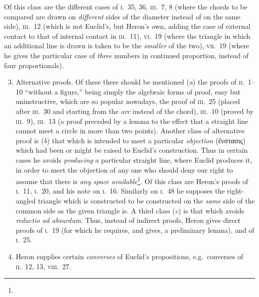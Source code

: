 Of this class are the different cases of \textsc{i}.~35, 36, \textsc{iii}.~7, 8 (where the chords to be compared are drawn on \emph{different} sides of the diameter instead of on the same side), \textsc{iii}.~12 (which is not Euclid's, but Heron's own, adding the case of external contact to that of internal contact in \textsc{iii}.~11), \textsc{vi}.~19 (where the triangle in which an additional line is drawn is taken to be the \emph{smaller} of the two), \textsc{vii}.~19 (where he gives the particular case of \emph{three} numbers in continued proportion, instead of four proportionals).

\begin{enumerate}[label=(\arabic*)]
	\setcounter{enumi}{2}
	\item Alternative proofs. Of these there should be mentioned (\emph{a}) the proofs of \textsc{ii}.~1--10 ``without a figure,'' being simply the algebraic forms of proof, easy but uninstructive, which are so popular nowadays, the proof of \textsc{iii}.~25 (placed after \textsc{iii}.~30 and starting from the \emph{arc} instead of the chord), \textsc{iii}.~10 (proved by \textsc{iii}.~9), \textsc{iii}.~13 (a proof preceded by a lemma to the effect that a straight line cannot meet a circle in more than two points). Another class of alternative proof is (\emph{b}) that which is intended to meet a particular \emph{objection} (ἔνστασις) which had been or might be raised to Euclid's construction. Thus in certain cases he avoids \emph{producing} a particular straight line, where Euclid produces it, in order to meet the objection of any one who should deny our right to assume that there is \emph{any space available}\footnote{}. Of this class are Heron's proofs of \textsc{i}.~11, \textsc{i}.~20, and his note on \textsc{i}.~16. Similarly on \textsc{i}.~48 he supposes the right-angled triangle which is constructed to be constructed on the \emph{same} side of the common side as the given triangle is. A third class (\emph{c}) is that which avoids \emph{reductio ad absurdum}. Thus, instead of indirect proofs, Heron gives direct proofs of \textsc{i}.~19 (for which he requires, and gives, a preliminary lemma), and of \textsc{i}.~25.
	\item Heron supplies certain \emph{converses} of Euclid's propositions, e.g.\ converses of \textsc{ii}.~12, 13, \textsc{viii}.~27.

\end{enumerate}
